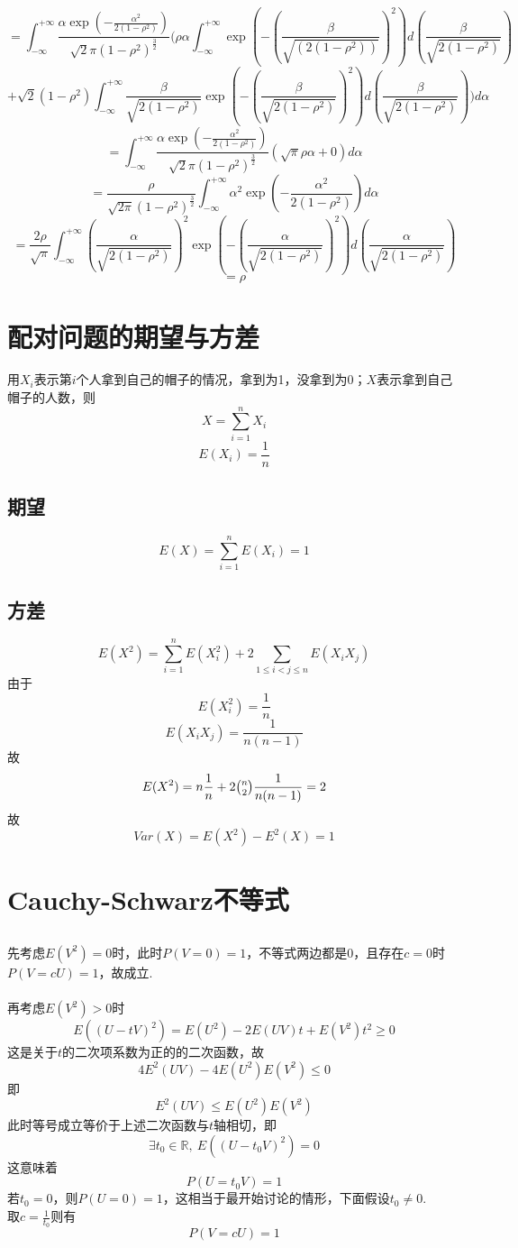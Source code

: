 \documentclass{article}
\begin{document}
\begin{CJK}{UTF8}{gbsn}
$$ =\int_{-\infty}^{+\infty}\frac{\alpha\exp(-\frac{\alpha^{2}}{2(1-\rho^{2})})}{\sqrt{2}\pi(1-\rho^{2})^{\frac{3}{2}}}(\rho\alpha\int_{-\infty}^{+\infty}\exp(-(\frac{\beta}{\sqrt{(2(1-\rho^{2}))}})^{2})d(\frac{\beta}{\sqrt{2(1-\rho^{2})}})$$
$$+\sqrt{2}(1-\rho^{2})\int_{-\infty}^{+\infty}\frac{\beta}{\sqrt{2(1-\rho^{2})}}\exp(-(\frac{\beta}{\sqrt{2(1-\rho^{2})}})^{2})d(\frac{\beta}{\sqrt{2(1-\rho^{2})}}))d\alpha$$
$$=\int_{-\infty}^{+\infty}\frac{\alpha\exp(-\frac{\alpha^{2}}{2(1-\rho^{2})})}{\sqrt{2}\pi(1-\rho^{2})^{\frac{3}{2}}}(\sqrt{\pi}\rho\alpha+0)d\alpha$$
$$=\frac{\rho}{\sqrt{2\pi}(1-\rho^{2})^{\frac{3}{2}}}\int_{-\infty}^{+\infty}\alpha^{2}\exp(-\frac{\alpha^{2}}{2(1-\rho^{2})})d\alpha$$
$$=\frac{2\rho}{\sqrt{\pi}}\int_{-\infty}^{+\infty}(\frac{\alpha}{\sqrt{2(1-\rho^{2})}})^{2}\exp(-(\frac{\alpha}{\sqrt{2(1-\rho^{2})}})^{2})d(\frac{\alpha}{\sqrt{2(1-\rho^{2})}})$$
$$=\rho$$
\section{配对问题的期望与方差}
用$X_{i}$表示第$i$个人拿到自己的帽子的情况，拿到为1，没拿到为0；$X$表示拿到自己帽子的人数，则
$$ X=\sum\limits_{i=1}^{n}X_{i}$$
$$ E(X_{i})=\frac{1}{n}$$
\subsection{期望}
$$ E(X)=\sum\limits_{i=1}^{n}E(X_{i})=1$$
\subsection{方差}
$$ E(X^{2})=\sum\limits_{i=1}^{n}E(X_{i}^{2})+2\sum\limits_{1\leq i<j\leq n}E(X_{i}X_{j})$$
由于
$$ E(X_{i}^{2})=\frac{1}{n}$$
$$ E(X_{i}X_{j})=\frac{1}{n(n-1)}$$
故
$$ E(X^{2})=n\frac{1}{n}+2\tbinom{n}{2}\frac{1}{n(n-1)}=2$$
故
$$ Var(X)=E(X^{2})-E^{2}(X)=1$$
\section{Cauchy-Schwarz不等式}
\subsection{}
先考虑$E(V^{2})=0$时，此时$P(V=0)=1$，不等式两边都是0，且存在$c=0$时$P(V=cU)=1$，故成立.
\\\\
再考虑$E(V^{2})>0$时
$$ E((U-tV)^{2})=E(U^{2})-2E(UV)t+E(V^{2})t^{2}\geq 0$$
这是关于$t$的二次项系数为正的的二次函数，故
$$ 4E^{2}(UV)-4E(U^{2})E(V^{2})\leq 0$$
即
$$ E^{2}(UV)\leq E(U^{2})E(V^{2})$$
此时等号成立等价于上述二次函数与$t$轴相切，即
$$ \exists t_{0}\in\mathbb{R},\ E((U-t_{0}V)^{2})=0$$
这意味着
$$ P(U=t_{0}V)=1$$
若$t_{0}=0$，则$P(U=0)=1$，这相当于最开始讨论的情形，下面假设$t_{0}\neq 0$.\\
取$c=\frac{1}{t_{0}}$则有
$$ P(V=cU)=1$$

\end{CJK}
\end{document}
